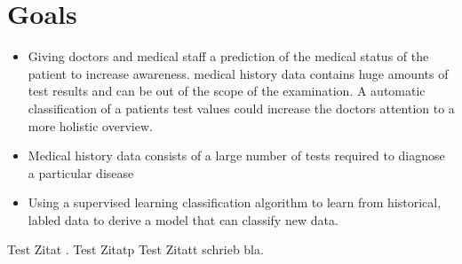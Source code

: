 \section{Goals}

\begin{itemize}
	\item Giving doctors and medical staff a prediction of the medical status of the patient to increase awareness. medical history data contains huge amounts of test results and can be out of the scope of the examination. A automatic classification of a patients test values could increase the doctors attention to a more holistic overview. 
	\item Medical history data consists of a large number of tests required to diagnose a particular disease \citep{gupta2007}
	\item Using a supervised learning classification algorithm to learn from historical, labled data to derive a model that can classify new data.
\end{itemize}



Test Zitat \cite{statistischesbundesamt2020}.
Test Zitatp \citep{janosi1988}
Test Zitatt \citet{janosi1988} schrieb bla.
